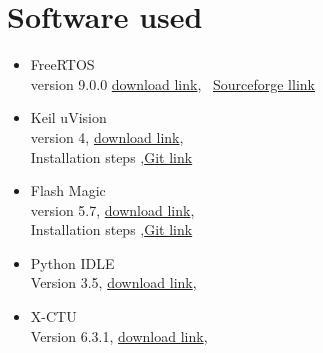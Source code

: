 \documentclass[a4paper,12pt,oneside]{book}
\begin{document}
\section{Software used}
\begin{itemize}
 \item FreeRTOS 
  \\version 9.0.0
\href{http://www.freertos.org/a00104.html}{download link}, 
\
\href{https://sourceforge.net/projects/freertos/files/latest/download?source=files}{Sourceforge llink}
 
  \item Keil uVision 
  \\ version 4, \href{https://www.keil.com/demo/eval/arm.htm}{download link}, 
  \\ Installation steps ,\href{https://github.com/akshar100/eyantra-firebird-resources/tree/master/Fire\%20Bird\%20V\%20LPC2148\%202010-12-29}{Git link}
    
  \item Flash Magic 
  \\ version 5.7, \href{http://www.flashmagictool.com/}{download link}, 
  \\ Installation steps ,\href{https://github.com/akshar100/eyantra-firebird-resources/tree/master/Fire\%20Bird\%20V\%20LPC2148\%202010-12-29}{Git link}

\item Python IDLE 
  \\ Version 3.5, \href{https://www.python.org/downloads/}{download link}, 
    
\item X-CTU 
  \\ Version 6.3.1, \href{http://www.digi.com/products/xbee-rf-solutions/xctu-software/xctu#productsupport-utilities}{download link}, 
\end{itemize}
\newpage
\end{document}
